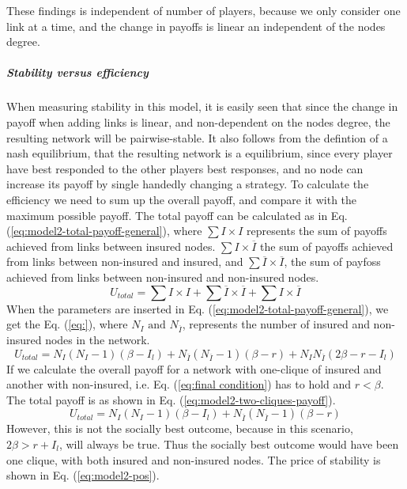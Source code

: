 These findings is independent of number of players, because we only consider one link at a time, and the change in payoffs is linear an independent of the nodes degree.
\subparagraph{Stability versus efficiency}
When measuring stability in this model, it is easily seen that since the change in payoff when adding links is linear, and non-dependent on the nodes degree, the resulting network will be pairwise-stable. It also follows from the defintion of a nash equilibrium, that the resulting network is a equilibrium, since every player have best responded to the other players best responses, and no node can increase its payoff by single handedly changing a strategy. 
To calculate the efficiency we need to sum up the overall payoff, and compare it with the maximum possible payoff.  The total payoff can be calculated as in Eq. (\ref{eq:model2-total-payoff-general}), where $\sum I \times I$ represents the sum of payoffs achieved from links between insured nodes. $\sum I \times \overline{I}$ the sum of payoffs achieved from links between non-insured and insured, and $\sum \overline{I} \times \overline{I}$, the sum of payfoss achieved from links between non-insured and non-insured nodes. 
\begin{equation}
U_{total}=\sum I \times I+\sum \overline{I}\times\overline{I}+\sum I\times\overline{I}
\label{eq:model2-total-payoff-general}
\end{equation}
When the parameters are inserted in Eq. (\ref{eq:model2-total-payoff-general}), we get the Eq. (\ref{eq:}), where $N_{I} \text{ and } N_{\overline{I}}$, represents the number of insured and non-insured nodes in the network.
\begin{equation}
U_{total}=N_{I}(N_{I}-1)(\beta-I_{l})+N_{\overline{I}}(N_{\overline{I}}-1)(\beta-r)+N_{I}N_{\overline{I}}(2\beta-r-I_{l})
\label{eq:model2-total-payoff}
\end{equation}
If we calculate the overall payoff for a network with one-clique of insured and another with non-insured, i.e. Eq. (\ref{eq:final condition}) has to hold and $r<\beta$. The total payoff is as shown in Eq. (\ref{eq:model2-two-cliques-payoff}).
\begin{equation}
U_{total}=N_{I}(N_{I}-1)(\beta-I_{l})+N_{\overline{I}}(N_{\overline{I}}-1)(\beta-r)
\label{eq:model2-two-cliques-payoff}
\end{equation}
However, this is not the socially best outcome, because in this scenario, $2\beta>r+I_{l}$, will always be true. Thus the socially best outcome would have been one clique, with both insured and non-insured nodes. The price of stability is shown in Eq. (\ref{eq:model2-pos}).

